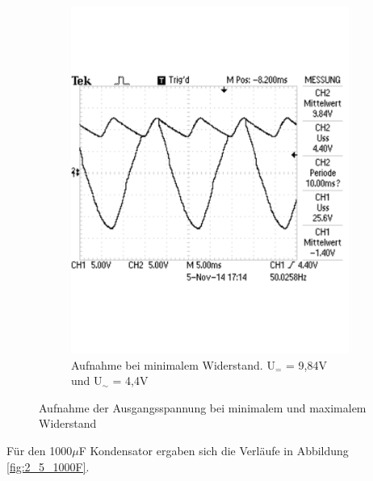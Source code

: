 \documentclass[12pt,a4paper]{article}
\begin{document}
\begin{figure}[H]
\begin{subfigure}[b]{0.48\textwidth}
                \includegraphics[width=\textwidth , scale = 0.4]{2_5_100F_2.pdf}
                \caption[Aufnahme bei minimalem Widerstand. U$_{=}$ = 9,84V und U$_\sim$ = 4,4V]{Aufnahme bei minimalem Widerstand. U$_{=}$ = 9,84V und U$_\sim$ = 4,4V}
  				\label{fig:2_5_100F_2}
        \end{subfigure}
        \caption{Aufnahme der Ausgangsspannung bei minimalem und maximalem Widerstand}
        \label{fig:2_5_100F}
\end{figure}

Für den 1000$\mu$F Kondensator ergaben sich die Verläufe in Abbildung \ref{fig:2_5_1000F}.
\end{document}
